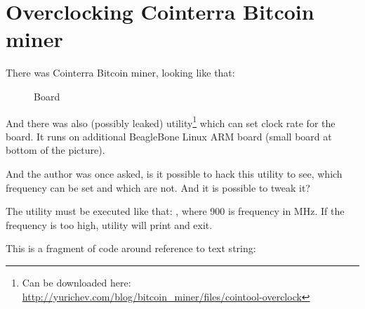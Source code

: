 \section{Overclocking Cointerra Bitcoin miner}

There was Cointerra Bitcoin miner, looking like that:

\begin{figure}[H]
\centering
{}
\caption{Board}
\end{figure}

And there was also (possibly leaked) utility\footnote{Can be downloaded here: \url{http://yurichev.com/blog/bitcoin_miner/files/cointool-overclock}}
which can set clock rate for the board.
It runs on additional BeagleBone Linux ARM board (small board at bottom of the picture).

And the author was once asked, is it possible to hack this utility to see, which frequency can be set and which are not.
And it is possible to tweak it?

The utility must be executed like that: , where 900 is frequency in MHz.
If the frequency is too high, utility will print  and exit.

This is a fragment of code around reference to  text string:

